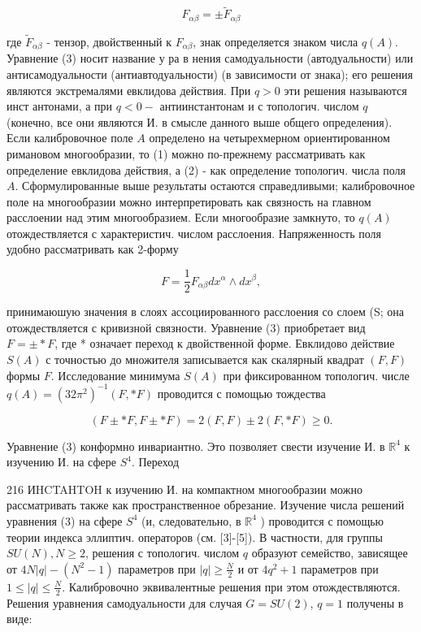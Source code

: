 \documentclass[10pt]{article}
\begin{document}
\[

F_{\alpha \beta}= \pm \tilde{F}_{\alpha \beta}

\]



где $\tilde{F}_{\alpha \beta}$ - тензор, двойственный к $F_{\alpha \beta}$, знак определяется знаком числа $q(A)$. Уравнение (3) носит название у ра в нения самодуальности (автодуальности) или антисамодуальности (антиавтодуальности) (в зависимости от знака); его решения являются экстремалями евклидова действия. При $q>0$ эти решения называются инст антонами, а при $q<0-$ антиинстантонам и с топологич. числом $q$ (конечно, все они являются И. в смысле данного выше общего определения). Если калибровочное поле $A$ определено на четырехмерном ориентированном римановом многообразии, то (1) можно по-прежнему рассматривать как определение евклидова действия, а (2) - как определение топологич. числа поля $A$. Сформулированные выше результаты остаются справедливыми; калибровочное поле на многообразии можно интерпретировать как связность на главном расслоении над этим многообразием. Если многообразие замкнуто, то $q(A)$ отождествляется с характеристич. числом расслоения. Напряженность поля удобно рассматривать как 2-форму



\[

F=\frac{1}{2} F_{\alpha \beta} d x^{\alpha} \wedge d x^{\beta},

\]



принимаюшую значения в слоях ассоциированного расслоения со слоем (S; она отождествляется с кривизной связности. Уравнение (3) приобретает вид $F= \pm * F$, где * означает переход к двойственной форме. Евклидово действие $S(A)$ с точностью до множителя записывается как скалярный квадрат $(F, F)$ формы $F$. Исследование минимума $S(A)$ при фиксированном топологич. числе $q(A)=\left(32 \pi^{2}\right)^{-1}(F, * F)$ проводится с помощью тождества



\[

(F \pm * F, F \pm * F)=2(F, F) \pm 2(F, * F) \geqslant 0 .

\]



Уравнение (3) конформно инвариантно. Это позволяет свести изучение И. в $\mathbb{R}^{4}$ к изучению И. на сфере $S^{4}$. Переход



216 ИHCTAHTOH к изучению И. на компактном многообразии можно рассматривать также как пространственное обрезание. Изучение числа решений уравнения (3) на сфере $S^{4}$ (и, следовательно, в $\mathbb{R}^{4}$ ) проводится с помощью теории индекса эллиптич. операторов (см. [3]-[5]). В частности, для группы $S U(N), N \geqslant 2$, решения с топологич. числом $q$ образуют семейство, зависящее от $4 N|q|-\left(N^{2}-1\right)$ параметров при $|q| \geqslant \frac{N}{2}$ и от $4 q^{2}+1$ параметров при $1 \leqslant|q| \leqslant \frac{N}{2}$. Калибровочно эквивалентные решения при этом отождествляются. Решения уравнения самодуальности для случая $G=S U(2)$, $q=1$ получены в виде:
\end{document}
